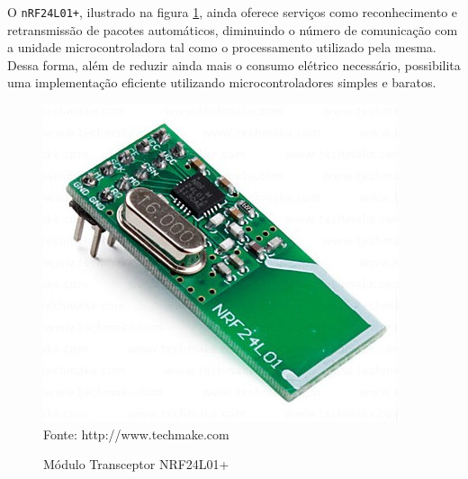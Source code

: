 
O \texttt{nRF24L01+}, ilustrado na figura \ref{figura:nrf}, ainda oferece serviços como reconhecimento e
retransmissão de pacotes automáticos, diminuindo o número de comunicação com a unidade microcontroladora tal
como o processamento utilizado pela mesma. Dessa forma, além de reduzir ainda mais o consumo elétrico
necessário, possibilita uma implementação eficiente utilizando microcontroladores simples e baratos.

\begin{figure}[h]
	\caption{Módulo Transceptor NRF24L01+}
	\centering
	\includegraphics[scale=0.25]{../images/nrf.jpg}
	\hspace{\linewidth}
	Fonte: http://www.techmake.com
	\label{figura:nrf}
\end{figure}

